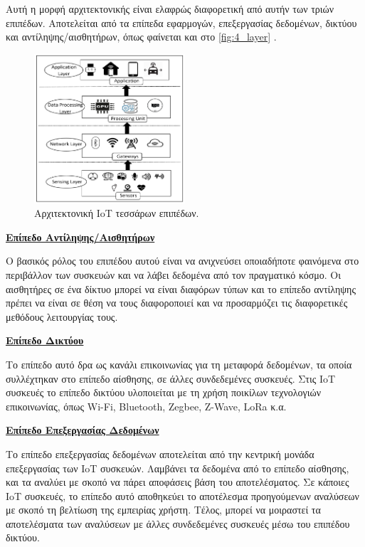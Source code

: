 Αυτή η μορφή αρχιτεκτονικής είναι ελαφρώς διαφορετική από αυτήν των τριών επιπέδων. Αποτελείται από τα επίπεδα εφαρμογών, επεξεργασίας δεδομένων, δικτύου και αντίληψης/αισθητήρων, όπως φαίνεται και στο \autoref{fig:4_layer} \cite{bib:kumar_2018}.

\begin{figure}[!ht]
	\centering
	\includegraphics[width=0.5\textwidth]{./images/chapter3/4_layer.png}
	\caption{Αρχιτεκτονική IoT τεσσάρων επιπέδων.}
	\label{fig:4_layer}
\end{figure}

\textbf{\underline{Επίπεδο Αντίληψης/Αισθητήρων}}

Ο βασικός ρόλος του επιπέδου αυτού είναι να ανιχνεύσει οποιαδήποτε φαινόμενα στο περιβάλλον των συσκευών και να λάβει δεδομένα από τον πραγματικό κόσμο. Οι αισθητήρες σε ένα δίκτυο μπορεί να είναι διαφόρων τύπων και το επίπεδο αντίληψης πρέπει να είναι σε θέση να τους διαφοροποιεί και να προσαρμόζει τις διαφορετικές μεθόδους λειτουργίας τους. 

\textbf{\underline{Επίπεδο Δικτύου}}

Το επίπεδο αυτό δρα ως κανάλι επικοινωνίας για τη μεταφορά δεδομένων, τα οποία συλλέχτηκαν στο επίπεδο αίσθησης, σε άλλες συνδεδεμένες συσκευές. Στις IoT συσκευές το επίπεδο δικτύου υλοποιείται με τη χρήση ποικίλων τεχνολογιών επικοινωνίας, όπως Wi-Fi, Bluetooth, Zegbee, Z-Wave, LoRa κ.α.

\textbf{\underline{Επίπεδο Επεξεργασίας Δεδομένων}}

Το επίπεδο επεξεργασίας δεδομένων αποτελείται από την κεντρική μονάδα επεξεργασίας των IoT συσκευών. Λαμβάνει τα δεδομένα από το επίπεδο αίσθησης, και τα αναλύει με σκοπό να πάρει αποφάσεις βάση του αποτελέσματος. Σε κάποιες IoT συσκευές, το επίπεδο αυτό αποθηκεύει το αποτέλεσμα προηγούμενων αναλύσεων με σκοπό τη βελτίωση της εμπειρίας χρήστη. Τέλος, μπορεί να μοιραστεί τα αποτελέσματα των αναλύσεων με άλλες συνδεδεμένες συσκευές μέσω του επιπέδου δικτύου.

